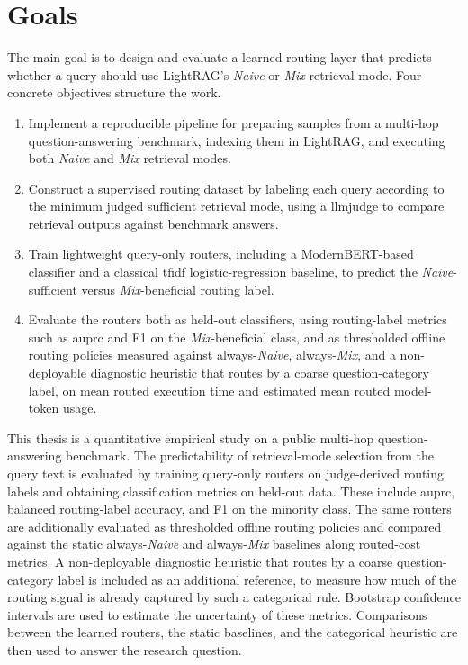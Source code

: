 \documentclass[english, bibtex]{kththesis}               %
\numberwithin{listing}{chapter}
\providecommand{\DIFdeltex}[1]{{\protect\color{red} \scriptsize #1}} %
\providecommand{\DIFdelbegin}{} %
\providecommand{\DIFdel}[1]{\texorpdfstring{\DIFdeltex{#1}}{}} %
\begin{document}
\section{Goals}
\label{sec:goals}
The main goal is to design and evaluate a learned routing layer that predicts whether a query should use LightRAG's \emph{Naive} or \emph{Mix} retrieval mode. Four concrete objectives structure the work.

\begin{enumerate}
\item Implement a reproducible pipeline for preparing samples from a multi-hop question-answering benchmark, indexing them in LightRAG, and executing both \emph{Naive} and \emph{Mix} retrieval modes.
\item Construct a supervised routing dataset by labeling each query according to the minimum judged sufficient retrieval mode, using a \gls{llmjudge} to compare retrieval outputs against benchmark answers.
\item Train lightweight query-only routers, including a ModernBERT-based classifier and a classical \gls{tfidf} logistic-regression baseline, to predict the \emph{Naive}-sufficient versus \emph{Mix}-beneficial routing label.
\item Evaluate the routers both as held-out classifiers, using routing-label metrics such as \gls{auprc} and F1 on the \emph{Mix}-beneficial class, and as thresholded offline routing policies measured against always-\emph{Naive}, always-\emph{Mix}, and a non-deployable diagnostic heuristic that routes by a coarse question-category label, on mean routed execution time and estimated mean routed model-token usage.
\end{enumerate}

\DIFdelbegin %

\DIFdel{This thesis is a quantitative empirical study on a public multi-hop question-answering benchmark. The predictability of retrieval-mode selection from the query text is evaluated by training query-only routers on judge-derived routing labels and obtaining classification metrics on held-out data. These include \gls{auprc}, balanced routing-label accuracy, and F1 on the minority class. The same routers are additionally evaluated as thresholded offline routing policies and compared against the static always-\emph{Naive} and always-\emph{Mix} baselines along routed-cost metrics. A non-deployable diagnostic heuristic that routes by a coarse question-category label is included as an additional reference, to measure how much of the routing signal is already captured by such a categorical rule. Bootstrap confidence intervals are used to estimate the uncertainty of these metrics. Comparisons between the learned routers, the static baselines, and the categorical heuristic are then used to answer the research question.
}%
\end{document}
